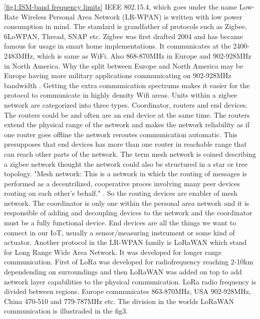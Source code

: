 \documentclass[article,a4paper]{IEEEtran}
\begin{document}
    \ref{fig1:ISM-band frequency limits}
    IEEE 802.15.4, which goes under the name Low-Rate Wireless Personal Area Network (LR-WPAN) is written with low power consumption in mind. The standard is grandfather of protocols such as Zigbee, 6LoWPAN, Thread, SNAP etc. Zigbee was first drafted 2004 and has became famous for usage in smart home implementations. It communicates at the 2400-2483MHz, which is same as WiFi. Also 868-870MHz in Europe and 902-928MHz in North America. Why the split between Europe and North America may be Europe having more military applications communicating on 902-928MHz bandwidth \cite{ISM-bandEUR}. Getting the extra communication spectrums makes it easier for the protocol to communicate in highly density Wifi areas. Units within a zigbee network are categorized into three types. Coordinator, routers and end devices. The routers could be and often are an end device at the same time. The routers extend the physical range of the network and makes the network reliability as if one router goes offline the network reroutes communication automatic. This presupposes that end devices has more than one router in reachable range that can reach other parts of the network. The term mesh network is coined describing a zigbee network thought the network could also be structured in a star or tree topology. "Mesh network: This is a network in which the routing of messages is performed as a decentrilized, cooperative proces involving many peer devices routing on each other's behalf." \cite{ZigbeeSpec}. So the routing devices are enabler of mesh network. The coordinator is only one within the personal area network and it is responsible of adding and decoupling devices to the network and the coordinator must be a fully functional device. End devices are all the things we want to connect in our IoT, usually a sensor/measuring instrument or some kind of actuator. 
    \newline\newline
    Another protocol in the LR-WPAN family is LoRaWAN which stand for Long Range Wide Area Network. It was developed for longer range communication. First of LoRa was developed for radiofrequency reaching 2-10km dependending on surroundings and then LoRaWAN was added on top to add network layer capabilities to the physical communication. LoRa radio frequency is divided between regions. Europe communicates 863-870MHz, USA 902-928MHz, China 470-510 and 779-787MHz etc. The division in the worlds LoRaWAN communication is illustraded in the fig3.
\end{document}
